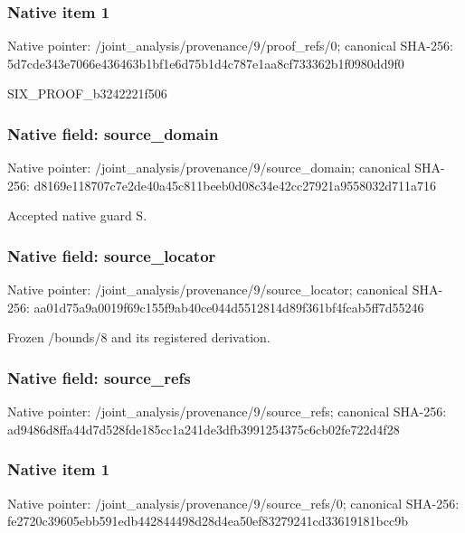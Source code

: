 \documentclass[10pt,a4paper]{article}
\begin{document}
\subsubsection{Native item 1}
Native pointer: /joint\_\allowbreak{}analysis/provenance/9/proof\_\allowbreak{}refs/0; canonical SHA-256: 5d7cde343e7066e436463b1bf1e6d75b1d4c787e1aa8cf733362b1f0980dd9f0

\begingroup\raggedright\sloppy SIX\_\allowbreak{}PROOF\_\allowbreak{}b3242221f506\par\endgroup

\subsubsection{Native field: source\_\allowbreak{}domain}
Native pointer: /joint\_\allowbreak{}analysis/provenance/9/source\_\allowbreak{}domain; canonical SHA-256: d8169e118707c7e2de40a45c811beeb0d08c34e42cc27921a9558032d711a716

\begingroup\raggedright\sloppy Accepted native guard S.\par\endgroup

\subsubsection{Native field: source\_\allowbreak{}locator}
Native pointer: /joint\_\allowbreak{}analysis/provenance/9/source\_\allowbreak{}locator; canonical SHA-256: aa01d75a9a0019f69c155f9ab40ce044d5512814d89f361bf4fcab5ff7d55246

\begingroup\raggedright\sloppy Frozen /\allowbreak{}bounds/\allowbreak{}8 and its registered derivation.\par\endgroup

\subsubsection{Native field: source\_\allowbreak{}refs}
Native pointer: /joint\_\allowbreak{}analysis/provenance/9/source\_\allowbreak{}refs; canonical SHA-256: ad9486d8ffa44d7d528fde185cc1a241de3dfb3991254375c6cb02fe722d4f28

\subsubsection{Native item 1}
Native pointer: /joint\_\allowbreak{}analysis/provenance/9/source\_\allowbreak{}refs/0; canonical SHA-256: fe2720c39605ebb591edb442844498d28d4ea50ef83279241cd33619181bcc9b
\end{document}
